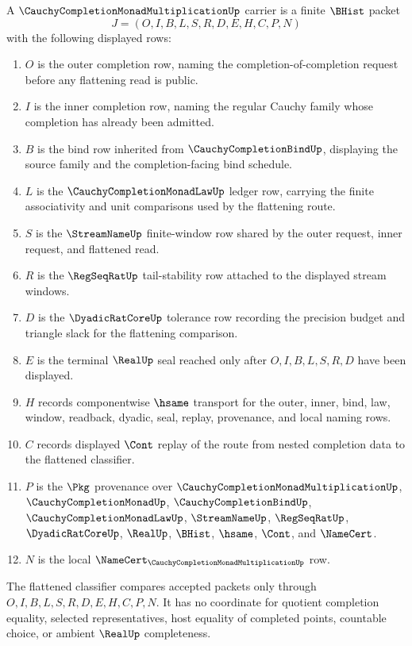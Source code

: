 \begin{definition}
\label{def:cauchy-completion-monad-multiplication-carrier}
A $\CauchyCompletionMonadMultiplicationUp$ carrier is a finite $\BHist$ packet
$$
J=(O,I,B,L,S,R,D,E,H,C,P,N)
$$
with the following displayed rows:
\begin{enumerate}
\item $O$ is the outer completion row, naming the completion-of-completion request before any flattening read is public.
\item $I$ is the inner completion row, naming the regular Cauchy family whose completion has already been admitted.
\item $B$ is the bind row inherited from $\CauchyCompletionBindUp$, displaying the source family and the completion-facing bind schedule.
\item $L$ is the $\CauchyCompletionMonadLawUp$ ledger row, carrying the finite associativity and unit comparisons used by the flattening route.
\item $S$ is the $\StreamNameUp$ finite-window row shared by the outer request, inner request, and flattened read.
\item $R$ is the $\RegSeqRatUp$ tail-stability row attached to the displayed stream windows.
\item $D$ is the $\DyadicRatCoreUp$ tolerance row recording the precision budget and triangle slack for the flattening comparison.
\item $E$ is the terminal $\RealUp$ seal reached only after $O,I,B,L,S,R,D$ have been displayed.
\item $H$ records componentwise $\hsame$ transport for the outer, inner, bind, law, window, readback, dyadic, seal, replay, provenance, and local naming rows.
\item $C$ records displayed $\Cont$ replay of the route from nested completion data to the flattened classifier.
\item $P$ is the $\Pkg$ provenance over $\CauchyCompletionMonadMultiplicationUp$, $\CauchyCompletionMonadUp$, $\CauchyCompletionBindUp$, $\CauchyCompletionMonadLawUp$, $\StreamNameUp$, $\RegSeqRatUp$, $\DyadicRatCoreUp$, $\RealUp$, $\BHist$, $\hsame$, $\Cont$, and $\NameCert$.
\item $N$ is the local $\NameCert_{\CauchyCompletionMonadMultiplicationUp}$ row.
\end{enumerate}
The flattened classifier compares accepted packets only through $O,I,B,L,S,R,D,E,H,C,P,N$. It has no coordinate for quotient completion equality, selected representatives, host equality of completed points, countable choice, or ambient $\RealUp$ completeness.
\end{definition}

